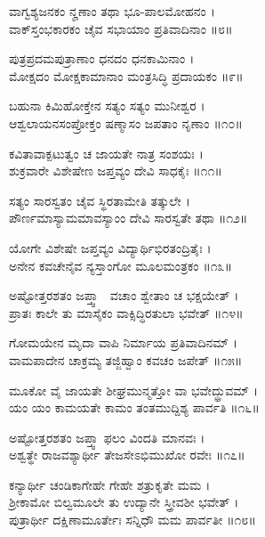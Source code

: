 ವಾಗ್ವಶ್ಯಜನಕಂ ನೄಣಾಂ ತಥಾ ಭೂ-ಪಾಲಮೋಹನಂ ।\\
ವಾಕ್‌ಸ್ತಂಭಕಾರಕಂ ಚೈವ ಸಭಾಯಾಂ ಪ್ರತಿವಾದಿನಾಂ ॥೮॥

ಪುತ್ರಪ್ರದಮಪುತ್ರಾಣಾಂ ಧನದಂ ಧನಕಾಮಿನಾಂ ।\\
ಮೋಕ್ಷದಂ ಮೋಕ್ಷಕಾಮಾನಾಂ ಮಂತ್ರಸಿದ್ಧಿ ಪ್ರದಾಯಕಂ ॥೯॥

ಬಹುನಾ ಕಿಮಿಹೋಕ್ತೇನ ಸತ್ಯಂ ಸತ್ಯಂ ಮುನೀಶ್ವರ ।\\
ಆಶ್ವಲಾಯನಸಂಪ್ರೋಕ್ತಂ ಷಣ್ಮಾಸಂ ಜಪತಾಂ ನೃಣಾಂ ॥೧೦॥

ಕವಿತಾವಾಕ್ಪಟುತ್ವಂ ಚ ಜಾಯತೇ ನಾತ್ರ ಸಂಶಯಃ ।\\
ಶುಕ್ರವಾರೇ ವಿಶೇಷೇಣ ಜಪ್ತವ್ಯಂ ದೇವಿ ಸಾಧಕೈಃ ॥೧೧॥

ಸತ್ಯಂ ಸಾರಸ್ವತಂ ಚೈವ ಸ್ಥಿರತಾಮೇತಿ ತತ್ಕುಲೇ ।\\
ಪೌರ್ಣಮಾಸ್ಯಾಮಮಾವಸ್ಯಾಂಂ ದೇವಿ ಸಾರಸ್ವತೇ ತಥಾ ॥೧೨॥

ಯೋಗೇ ವಿಶೇಷೇ ಜಪ್ತವ್ಯಂ ವಿದ್ಯಾರ್ಥಿಭಿರತಂದ್ರಿತೈಃ ।\\
ಅನೇನ ಕವಚೇನೈವ ನ್ಯಸ್ತಾಂಗೋ ಮೂಲಮಂತ್ರಕಂ ॥೧೩॥

ಅಷ್ಟೋತ್ತರಶತಂ ಜಪ್ತ್ವಾ  ವಚಾಂ ಶ್ವೇತಾಂ ಚ ಭಕ್ಷಯೇತ್ ।\\
ಪ್ರಾತಃ ಕಾಲೇ ತು ಮಾಸೈಕಂ ವಾಕ್ಸಿದ್ಧಿರತುಲಾ ಭವೇತ್ ॥೧೪॥

ಗೋಮಯೇನ ಮೃದಾ ವಾಪಿ ನಿರ್ಮಾಯ ಪ್ರತಿವಾದಿನಮ್ ।\\
ವಾಮಪಾದೇನ ಚಾಕ್ರಮ್ಯ ತಜ್ಜಿಹ್ವಾಂ ಕವಚಂ ಜಪೇತ್ ॥೧೫॥

ಮೂಕೋ ವೈ ಜಾಯತೇ ಶೀಘ್ರಮುನ್ಮತ್ತೋ ವಾ ಭವೇದ್ಧ್ರುವಮ್ ।\\
ಯಂ ಯಂ ಕಾಮಯತೇ ಕಾಮಂ ತಂತಮುದ್ದಿಶ್ಯ ಪಾರ್ವತಿ ॥೧೬॥

ಅಷ್ಟೋತ್ತರಶತಂ ಜಪ್ತ್ವಾ ಫಲಂ ವಿಂದತಿ ಮಾನವಃ ।\\
ಅಶ್ವತ್ಥೇ ರಾಜವಶ್ಯಾರ್ಥೀ ತೇಜಸೇಽಭಿಮುಖೋ ರವೇಃ ॥೧೭॥

ಕನ್ಯಾರ್ಥೀ ಚಂಡಿಕಾಗೇಹೇ ಗೇಹೇ ಶತ್ರುಕೃತೇ ಮಮ ।\\
ಶ್ರೀಕಾಮೋ ಬಿಲ್ವಮೂಲೇ ತು ಉದ್ಯಾನೇ ಸ್ತ್ರೀವಶೀ ಭವೇತ್ ।\\
ಪುತ್ರಾರ್ಥೀ ದಕ್ಷಿಣಾಮೂರ್ತೇಃ ಸನ್ನಿಧೌ ಮಮ ಪಾರ್ವತೀ ॥೧೮॥

